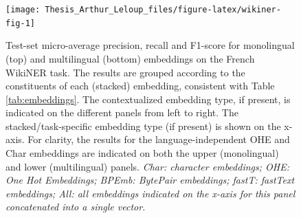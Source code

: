 \documentclass[12pt,a4paper,]{book}
\begin{document}
\begin{figure}

{\centering \texttt{[image: Thesis\_Arthur\_Leloup\_files/figure-latex/wikiner-fig-1]} 

}

\caption{Test-set micro-average precision, recall and F1-score for monolingual (top) and multilingual (bottom) embeddings on the French WikiNER task. The results are grouped according to the constituents of each (stacked) embedding, consistent with Table \ref{tab:embeddings}. The contextualized embedding type, if present, is indicated on the different panels from left to right. The stacked/task-specific embedding type (if present) is shown on the x-axis. For clarity, the results for the language-independent OHE and Char embeddings are indicated on both the upper (monolingual) and lower (multilingual) panels. \emph{Char: character embeddings; OHE: One Hot Embeddings; BPEmb: BytePair embeddings; fastT: fastText embeddings; All: all embeddings indicated on the x-axis for this panel concatenated into a single vector.}}\label{fig:wikiner-fig}
\end{figure}
\end{document}
